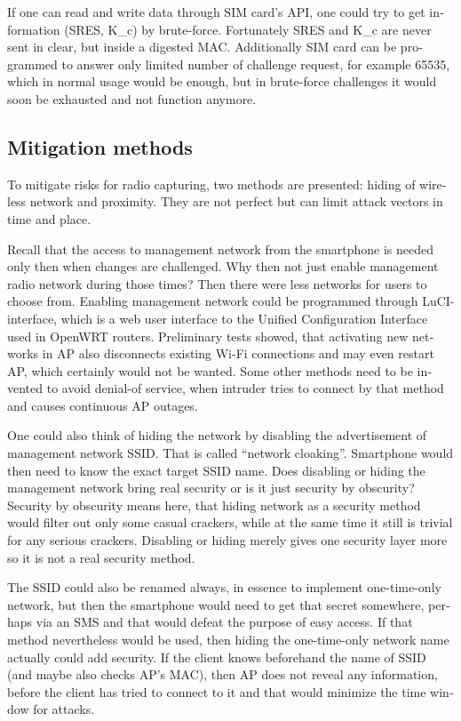 \documentclass[12pt,a4paper,english]{tutthesis}
\begin{document}
\begin{otherlanguage}{english}
If one can read and write data through SIM card's API,
one could try to get information (SRES, K\_c) by brute-force. 
Fortunately SRES and K\_c are never sent in clear, but inside
a digested MAC.
 Additionally SIM card can be programmed to answer only
limited number of challenge request, for example 65535, which in
normal usage would be enough, but in brute-force challenges 
it would soon be exhausted and not function anymore.


\subsection{Mitigation methods}
\label{sec-6-4-6}
To mitigate risks for radio capturing, two methods are presented: hiding of
wireless network and proximity. They are not perfect but can
limit attack vectors in time and place.


Recall that the access to management network from the smartphone is
 needed only then when changes
are challenged. Why then not just enable management radio network
during those times? Then there were less networks for users to choose from.
Enabling management network could be programmed through 
LuCI-interface, which is a web user interface to the Unified
 Configuration Interface used in OpenWRT routers.
Preliminary tests showed, that activating new networks in AP also 
disconnects existing Wi-Fi connections and may even restart AP,
which certainly would not be wanted. Some other methods need to
be invented to avoid denial-of service, when intruder tries to 
connect by that method and causes continuous AP outages.

\label{tag:hidessid}
One could also think of hiding the network by disabling the
advertisement of management network SSID. That is called ``network
cloaking''.  Smartphone would then need to know the exact target SSID name.
Does disabling or hiding the management network bring real security or
is it just security by obscurity?  Security by obscurity means here,
that hiding network 
as a security method would filter out only some casual crackers, while
at the same time it still is trivial for any serious crackers.
Disabling or hiding  merely gives one security layer more so it is not
a real security method.

The SSID could also be renamed always, in essence to implement
one-time-only network, but then the smartphone would need to get that
secret somewhere, perhaps via an SMS and that would defeat the purpose
of easy access.  If that method nevertheless would be used, then
hiding the one-time-only network name actually could add security. 
If the client knows beforehand the name of SSID
(and maybe also checks AP's MAC), then AP does not reveal any information,
before the client has tried to connect to it and that would minimize
the time window for attacks.


\end{otherlanguage}
\end{document}

